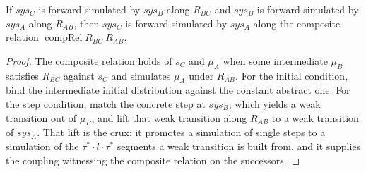 \begin{theorem}
  \label{thm:forward-trans}
  \leanok
  If $sys_C$ is forward-simulated by $sys_B$ along $R_{BC}$ and $sys_B$ is forward-simulated by $sys_A$ along $R_{AB}$, then $sys_C$ is forward-simulated by $sys_A$ along the composite relation $\operatorname{compRel} R_{BC}\ R_{AB}$.
\end{theorem}

\begin{proof}\leanok
  The composite relation holds of $s_C$ and $\mu_A$ when some intermediate $\mu_B$ satisfies $R_{BC}$ against $s_C$ and simulates $\mu_A$ under $R_{AB}$.
  For the initial condition, bind the intermediate initial distribution against the constant abstract one.
  For the step condition, match the concrete step at $sys_B$, which yields a weak transition out of $\mu_B$, and lift that weak transition along $R_{AB}$ to a weak transition of $sys_A$.
  That lift is the crux: it promotes a simulation of single steps to a simulation of the $\tau^\ast \cdot l \cdot \tau^\ast$ segments a weak transition is built from, and it supplies the coupling witnessing the composite relation on the successors.
\end{proof}
